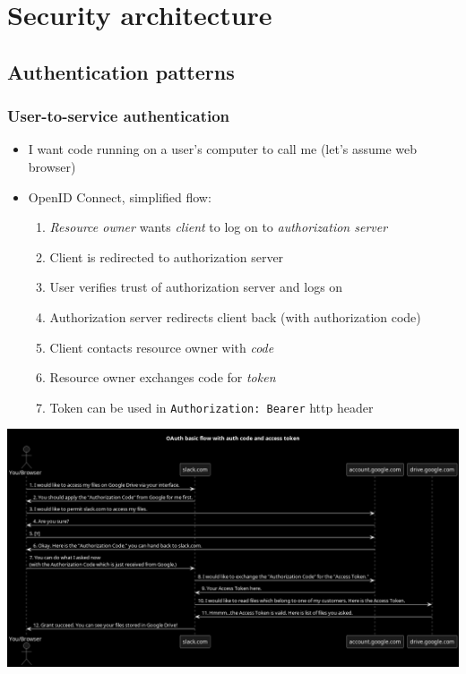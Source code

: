 \documentclass[8pt]{article}
\begin{document}
\section{Security architecture}
\label{sec:org5e41635}
\subsection{Authentication patterns}
\label{sec:org2054ea1}
\subsubsection{User-to-service authentication}
\label{sec:org3b2f664}
\begin{itemize}
\item I want code running on a user's computer to call me (let's assume web browser)
\item OpenID Connect, simplified flow:
\begin{enumerate}
\item \emph{Resource owner} wants \emph{client} to log on to \emph{authorization server}
\item Client is redirected to authorization server
\item User verifies trust of authorization server and logs on
\item Authorization server redirects client back (with authorization code)
\item Client contacts resource owner with \emph{code}
\item Resource owner exchanges code for \emph{token}
\item Token can be used in \texttt{Authorization: Bearer} http header
\end{enumerate}
\end{itemize}

\begin{center}
\includegraphics[width=.9\linewidth]{openid.png}
\end{center}
\end{document}
